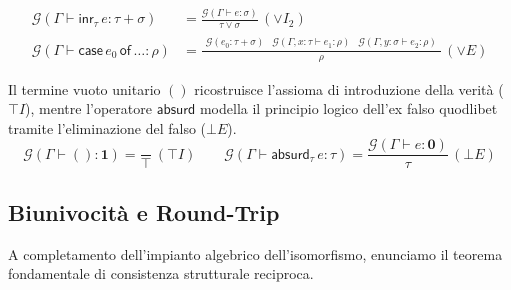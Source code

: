 \begin{description}[leftmargin=1.5em, style=nextline, font=\bfseries]
\begin{align*}
            \mathcal{G}(\Gamma \vdash \mathsf{inr}_{\tau} \, e : \tau + \sigma) &= 
                \frac{\mathcal{G}(\Gamma \vdash e : \sigma)}{\tau \lor \sigma} \, (\lor I_2) \\[0.6em]
            \mathcal{G}(\Gamma \vdash \mathsf{case} \, e_0 \, \mathsf{of} \, \dots : \rho) &= 
                \frac{
                    \begin{smallmatrix} 
                        \mathcal{G}(e_0 : \tau + \sigma)                & 
                        \mathcal{G}(\Gamma, x:\tau \vdash e_1 : \rho)   & 
                        \mathcal{G}(\Gamma, y:\sigma \vdash e_2 : \rho) 
                    \end{smallmatrix}
                }{\rho} \, (\lor E)
        \end{align*}
    \item[Costanti (Unit / Absurd)]
        Il termine vuoto unitario $()$ ricostruisce l'assioma di introduzione della verità ($\top I$), mentre l'operatore $\mathsf{absurd}$ modella il 
        principio logico dell'ex falso quodlibet tramite l'eliminazione del falso ($\bot E$).
        $$ \mathcal{G}(\Gamma \vdash () : \mathbf{1}) = \frac{}{\top} \, (\top I) \qquad 
           \mathcal{G}(\Gamma \vdash \mathsf{absurd}_{\tau} \, e : \tau) = \frac{\mathcal{G}(\Gamma \vdash e : \mathbf{0})}{\tau} \, (\bot E) $$
\end{description}

\subsection{Biunivocità e Round-Trip}
A completamento dell'impianto algebrico dell'isomorfismo, enunciamo il teorema fondamentale di consistenza strutturale reciproca.

